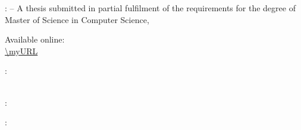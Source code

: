 \thispagestyle{empty}

\hfill

\vfill

\noindent\myName: \textit{\myTitle} -- A thesis submitted in partial fulfilment of the requirements for the degree of Master of Science in Computer Science\xspace,
\textcopyright\ \myTime

\medskip

\noindent
Available online: \\
\url{\myURL}

\bigskip

\noindent{}: \\
\myProf \\
\mySupervisor

\medskip

\noindent{}: \\
\myLocation

\medskip

\noindent{}: \\
\myTime